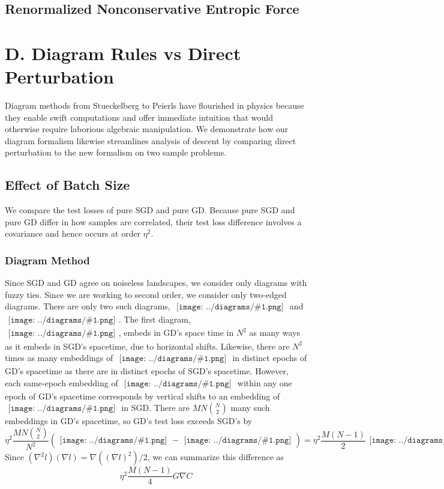 \documentclass{article}
\newcommand{\sdia}[1]{\begin{gathered}\texttt{[image: ../diagrams/\#1.png]}\end{gathered}}
\begin{document}
    \subsection*{Renormalized Nonconservative Entropic Force}

\section*{D. Diagram Rules vs Direct Perturbation} \label{sect:compare}
    Diagram methods from Stueckelberg to Peierls have flourished in physics
    because they enable swift computations and offer immediate intuition that
    would otherwise require laborious algebraic manipulation.  We demonstrate
    how our diagram formalism likewise streamlines analysis of descent by
    comparing direct perturbation to the new formalism on two sample problems.

    \subsection*{Effect of Batch Size}
        We compare the test losses of pure SGD and pure GD.  Because pure
        SGD and pure GD differ in how samples are correlated, their test loss
        difference involves a covariance and hence occurs at order $\eta^2$.  

        \subsubsection*{Diagram Method}
            Since SGD and GD agree on noiseless landscapes, we consider only
            diagrams with fuzzy ties.  Since we are working to second order, we
            consider only two-edged diagrams.  There are only two such
            diagrams, $\sdia{(01-2)(02-12)}$ and $\sdia{(01-2)(01-12)}$.  The
            first diagram, $\sdia{(01-2)(02-12)}$, embeds in GD's space time in
            $N^2$ as many ways as it embeds in SGD's spacetime, due to
            horizontal shifts.  Likewise, there are $N^2$ times as many
            embeddings of $\sdia{(01-2)(02-12)}$ in distinct epochs of GD's
            spacetime as there are in distinct epochs of SGD's spacetime.
            However, each same-epoch embedding of $\sdia{(01-2)(01-12)}$ within
            any one epoch of GD's spacetime corresponds by vertical shifts to
            an embedding of $\sdia{(0-1-2)(01-12)}$ in SGD.  There are
            $MN{N\choose 2}$ many such embeddings in GD's spacetime, so GD's
            test loss exceeds SGD's by 
            $$
                \eta^2 \frac{MN{N\choose 2}}{N^2}
                (\sdia{(01-2)(01-12)} - \sdia{(0-1-2)(01-12)}) 
                =
                \eta^2 \frac{M(N-1)}{2} \sdia{c(01-2)(01-12)}
            $$
            Since $(\nabla^2 l) (\nabla l) = \nabla((\nabla l)^2)/2$, we can 
            summarize this difference as
            $$
                \eta^2 \frac{M(N-1)}{4}
                G \nabla C 
            $$
\end{document}
